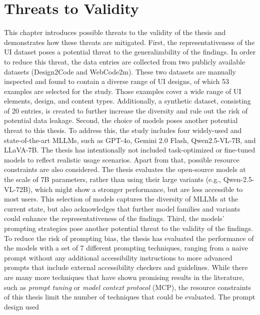  \chapter{Threats to Validity}\label{chapter:threats}
This chapter introduces possible threats to the validity of 
the thesis and demonstrates how these threats 
are mitigated.\newline
First, the representativeness of the UI dataset poses 
a potential threat to the generalizability of the findings.
In order to reduce this threat, the data entries are 
collected from two publicly available datasets (Design2Code and WebCode2m).
These two datasets are manually inspected and found to contain a diverse 
range of UI designs, of which 53 examples are selected for the study. 
Those examples cover a wide range of UI elements, design, and 
content types. Additionally, a synthetic dataset, consisting of 
20 entries, is created to 
further increase the diversity and rule out the risk of 
potential data leakage.\newline 
Second, the choice of models poses another potential threat 
to this thesis. To address this, the study includes four widely-used 
and state-of-the-art MLLMs, such as GPT-4o, Gemini 2.0 Flash, Qwen2.5-VL-7B,
and LLaVA-7B. The thesis has intentionally not included 
task-optimized or fine-tuned models to reflect realistic 
usage scenarios. Apart from that, possible resource constraints 
are also considered. The thesis evaluates the open-source 
models at the scale of 7B parameters, rather than using their 
large variants (e.g., Qwen-2.5-VL-72B), which might show 
a stronger performance, but are less accessible to most users.
This selection of models captures the diversity of MLLMs at 
the current state, but also acknowledges that further 
model families and variants could enhance the representativeness of the findings.\newline
Third, the models' prompting strategies pose another potential threat 
to the validity of the findings. To reduce the risk of 
prompting bias, the thesis has evaluated the performance of 
the models with a set of 7 different prompting techniques, 
ranging from a naive prompt without any additional accessibility instructions
to more advanced prompts that include external accessibility
checkers and guidelines. While there are many more techniques 
that have shown promising results in the literature, such as 
\textit{prompt tuning} or \textit{model context protocol} (MCP), 
the resource constraints of this thesis limit the number of
techniques that could be evaluated. The prompt design used 
